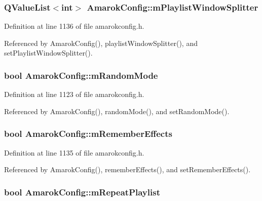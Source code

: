 \subsubsection{\setlength{\rightskip}{0pt plus 5cm}QValue\-List$<$int$>$ {\bf Amarok\-Config::m\-Playlist\-Window\-Splitter}\hspace{0.3cm}{\tt  [protected]}}\label{classAmarokConfig_AmarokConfigp22}




Definition at line 1136 of file amarokconfig.h.

Referenced by Amarok\-Config(), playlist\-Window\-Splitter(), and set\-Playlist\-Window\-Splitter().
\subsubsection{\setlength{\rightskip}{0pt plus 5cm}bool {\bf Amarok\-Config::m\-Random\-Mode}\hspace{0.3cm}{\tt  [protected]}}\label{classAmarokConfig_AmarokConfigp9}




Definition at line 1123 of file amarokconfig.h.

Referenced by Amarok\-Config(), random\-Mode(), and set\-Random\-Mode().
\subsubsection{\setlength{\rightskip}{0pt plus 5cm}bool {\bf Amarok\-Config::m\-Remember\-Effects}\hspace{0.3cm}{\tt  [protected]}}\label{classAmarokConfig_AmarokConfigp21}




Definition at line 1135 of file amarokconfig.h.

Referenced by Amarok\-Config(), remember\-Effects(), and set\-Remember\-Effects().
\subsubsection{\setlength{\rightskip}{0pt plus 5cm}bool {\bf Amarok\-Config::m\-Repeat\-Playlist}\hspace{0.3cm}{\tt  [protected]}}\label{classAmarokConfig_AmarokConfigp8}




